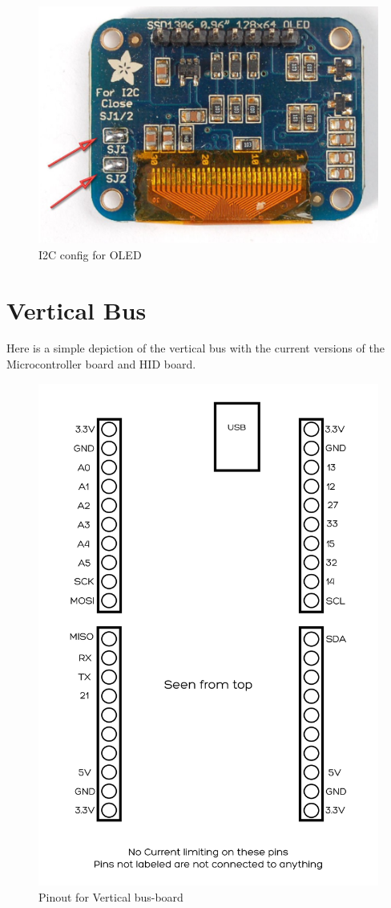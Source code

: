 \documentclass{article}
\begin{document}
  \begin{figure}[H]
  	\centering
  	\includegraphics[width=1\linewidth]{oled.png}
  	\caption{I2C config for OLED}
 	 \label{fig:oled}
\end{figure}
 \section{Vertical Bus}
 Here is a simple depiction of the vertical bus with the current versions of the Microcontroller board and HID board.
  \begin{figure}[H]
  	\centering
  	\includegraphics[width=0.7\linewidth]{vertical-bus-board.png}
  	\caption{Pinout for Vertical bus-board}
 	 \label{fig:vertical}
\end{figure}
\newpage
\end{document}
